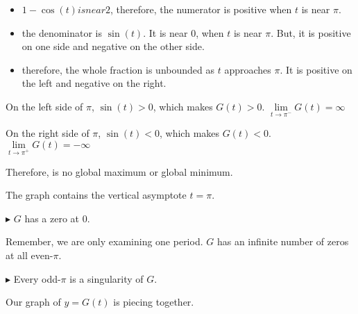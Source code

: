 \documentclass{ximera}
\begin{document}
\begin{itemize}
\item $1-\cos(t) is near 2$, therefore, the numerator is positive when $t$ is near $\pi$.
\item the denominator is $\sin(t)$. It is near $0$, when $t$ is near $\pi$. But, it is positive on one side and negative on the other side.
\item therefore, the whole fraction is unbounded as $t$ approaches $\pi$.  It is positive on the left and negative on the right.
\end{itemize}




On the left side of $\pi$, $\sin(t) > 0$, which makes $G(t) > 0$.   $\lim\limits_{t \to \pi^{-}}G(t) = \infty$ 

On the right side of $\pi$, $\sin(t) < 0$, which makes $G(t) < 0$.   $\lim\limits_{t \to \pi^{+}}G(t) = -\infty$ 

Therefore, is no global maximum or global minimum.

The graph contains the vertical asymptote $t=\pi$.



$\blacktriangleright$ $G$ has a zero at $0$.  

Remember, we are only examining one period.  $G$ has an infinite number of zeros at all even-$\pi$.





$\blacktriangleright$ Every odd-$\pi$ is a singularity of $G$.




Our graph of $y=G(t)$ is piecing together.
\end{document}
